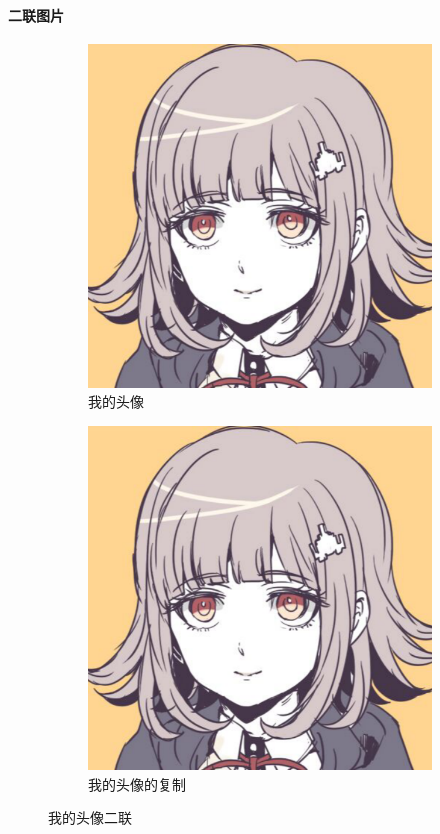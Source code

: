 \documentclass{article}
\begin{document}
        \paragraph{二联图片}
        \begin{figure}[h!]
            \centering
            \begin{subfigure}[b]{0.4\linewidth}
                \includegraphics[width=\linewidth]{myavatar.png}
                \caption{我的头像}
            \end{subfigure}
            \begin{subfigure}[b]{0.4\linewidth}
                \includegraphics[width=\linewidth]{myavatar.png}
                \caption{我的头像的复制}
            \end{subfigure}
            \caption{我的头像二联}
            \label{fig:linkedavatar}
        \end{figure}
\end{document}
